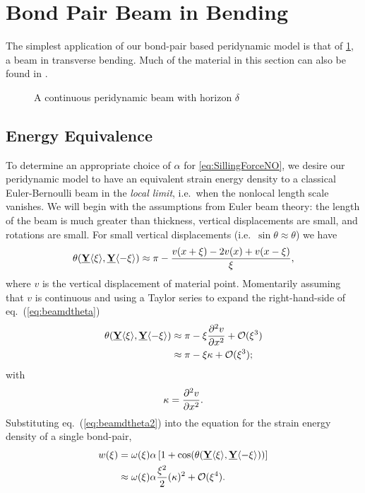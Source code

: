\section{Bond Pair Beam in Bending}
\label{sec:BPbeam}
The simplest application of our bond-pair based peridynamic model is that of \cref{fig:continuousbeam}, a beam in transverse bending.
Much of the material in this section can also be found in \cite{ogrady2014beams}.
%
\begin{figure}[h]
  \centering
{}
\caption{A continuous peridynamic beam with horizon $\delta$}
\label{fig:continuousbeam}
\end{figure}
%

\subsection{Energy Equivalence}
\label{sec:beamEnergy}
To determine an appropriate choice of $\alpha$ for \cref{eq:SillingForceNO}, we desire our peridynamic model to have an equivalent strain energy density to a classical Euler-Bernoulli beam in the \emph{local limit}, i.e.\ when the nonlocal length scale vanishes.  We will begin with the assumptions from Euler beam theory: the length of the beam is much greater than thickness, vertical displacements are small, and rotations are small. For small vertical displacements (i.e.\ $\sin{\theta} \approx \theta$) we have
%
\begin{equation}
\theta(\vstate{Y}{}{\xi},\vstate{Y}{}{\mathbf{-\xi}}) \approx \pi-\frac{v(x+\xi)-2v(x)+v(x-\xi)}{\xi},
\label{eq:beamdtheta}
\end{equation}
%
where $v$ is the vertical displacement of material point.  Momentarily assuming that $v$ is continuous and using a Taylor series to expand the right-hand-side of eq.~(\ref{eq:beamdtheta})  
%
\begin{align}
\theta(\vstate{Y}{}{\xi},\vstate{Y}{}{\mathbf{-\xi}}) &\approx \pi-\xi \frac{\partial^2 v}{\partial x^2}+\mathcal{O}(\xi^3) \notag \\
&\approx  \pi-\xi \kappa +\mathcal{O}(\xi^3); 
\label{eq:beamdtheta2}
\end{align}
with
\begin{equation}
\kappa = \frac{\partial^2 v}{\partial x^2}.\notag
\end{equation}
%
Substituting eq.~(\ref{eq:beamdtheta2}) into the equation for the strain energy density of a single bond-pair,
%
\begin{align}
\label{eq:continuousBeamw}
w(\xi) &= \omega(\xi) \alpha \left[1+\cos(\theta(\vstate{Y}{}{\xi},\vstate{Y}{}{\mathbf{-\xi}})) \right] \notag\\
&\approx \omega(\xi) \alpha\frac{\xi^2}{2}(\kappa)^2 +\mathcal{O}(\xi^4).\notag
\end{align}
